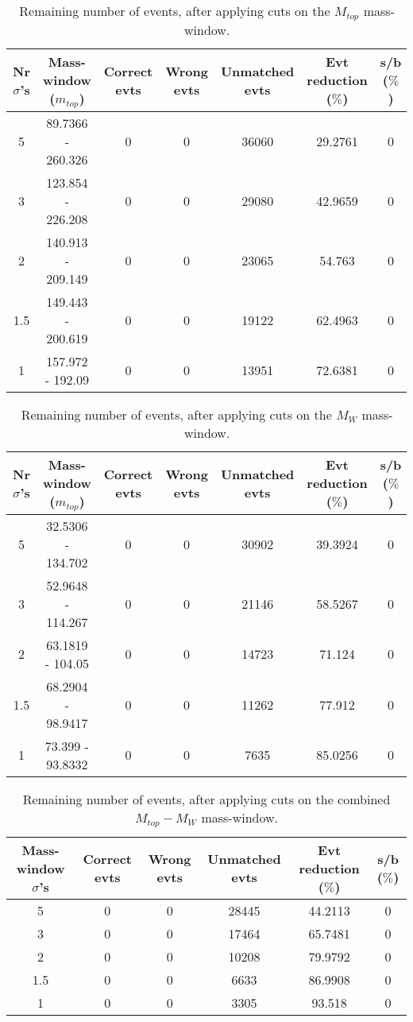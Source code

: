 \documentclass{article}
\begin{document}
 \begin{table}[h!t] 
  \caption{Remaining number of events, after applying cuts on the $M_{top}$ mass-window.} 
  \centering 
   \begin{tabular}{c|c|c|c|c|c|c}
     Nr $\sigma$'s & Mass-window ($m_{top}$)    & Correct evts    & Wrong evts     & Unmatched evts   & Evt reduction ($\%$)    & s/b ($\%$)     \\
     \hline
     5 & 89.7366 - 260.326  &   0  &  0  &  36060  &  29.2761 &  0 \\ 
     3 & 123.854 - 226.208  &   0  &  0  &  29080  &  42.9659 &  0 \\ 
     2 & 140.913 - 209.149  &   0  &  0  &  23065  &  54.763 &  0 \\ 
     1.5 & 149.443 - 200.619  &   0  &  0  &  19122  &  62.4963 &  0 \\ 
     1 & 157.972 - 192.09  &   0  &  0  &  13951  &  72.6381 &  0   \end{tabular} 
 \end{table} 
 
 \begin{table}[h!t] 
  \caption{Remaining number of events, after applying cuts on the $M_{W}$ mass-window.} 
  \centering 
   \begin{tabular}{c|c|c|c|c|c|c}
     Nr $\sigma$'s & Mass-window ($m_{top}$)    & Correct evts    & Wrong evts     & Unmatched evts   & Evt reduction ($\%$)    & s/b ($\%$)     \\
     \hline
     5 & 32.5306 - 134.702  &   0  &  0  &  30902  &  39.3924 &  0 \\ 
     3 & 52.9648 - 114.267  &   0  &  0  &  21146  &  58.5267 &  0 \\ 
     2 & 63.1819 - 104.05  &   0  &  0  &  14723  &  71.124 &  0 \\ 
     1.5 & 68.2904 - 98.9417  &   0  &  0  &  11262  &  77.912 &  0 \\ 
     1 & 73.399 - 93.8332  &   0  &  0  &  7635  &  85.0256 &  0   \end{tabular} 
 \end{table} 
 
 \begin{table}[h!t] 
  \caption{Remaining number of events, after applying cuts on the combined $M_{top}-M_{W}$ mass-window.} 
  \centering 
   \begin{tabular}{c|c|c|c|c|c} 
     Mass-window $\sigma$'s & Correct evts    & Wrong evts     & Unmatched evts  & Evt reduction ($\%$)   & s/b ($\%$)     \\ 
     \hline
     5 & 0  &  0  &  28445  &  44.2113 &  0 \\ 
     3 & 0  &  0  &  17464  &  65.7481 &  0 \\ 
     2 & 0  &  0  &  10208  &  79.9792 &  0 \\ 
     1.5 & 0  &  0  &  6633  &  86.9908 &  0 \\ 
     1 & 0  &  0  &  3305  &  93.518 &  0   \end{tabular} 
 \end{table} 
 
\end{document}

